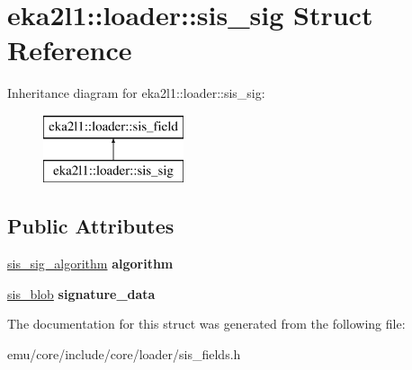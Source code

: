\hypertarget{structeka2l1_1_1loader_1_1sis__sig}{}\section{eka2l1\+:\+:loader\+:\+:sis\+\_\+sig Struct Reference}
\label{structeka2l1_1_1loader_1_1sis__sig}
Inheritance diagram for eka2l1\+:\+:loader\+:\+:sis\+\_\+sig\+:\begin{figure}[H]
\begin{center}
\leavevmode
\includegraphics[height=2.000000cm]{structeka2l1_1_1loader_1_1sis__sig}
\end{center}
\end{figure}
\subsection*{Public Attributes}
\begin{DoxyCompactItemize}
\item 
\mbox{\label{structeka2l1_1_1loader_1_1sis__sig_a62c50d9f8d2141408679eba396ae6fae}} 
\mbox{\hyperlink{structeka2l1_1_1loader_1_1sis__sig__algorithm}{sis\+\_\+sig\+\_\+algorithm}} {\bfseries algorithm}
\item 
\mbox{\label{structeka2l1_1_1loader_1_1sis__sig_ac22284bfe1a9bb11c05bc37813faa860}} 
\mbox{\hyperlink{structeka2l1_1_1loader_1_1sis__blob}{sis\+\_\+blob}} {\bfseries signature\+\_\+data}
\end{DoxyCompactItemize}


The documentation for this struct was generated from the following file\+:\begin{DoxyCompactItemize}
\item 
emu/core/include/core/loader/sis\+\_\+fields.\+h\end{DoxyCompactItemize}
